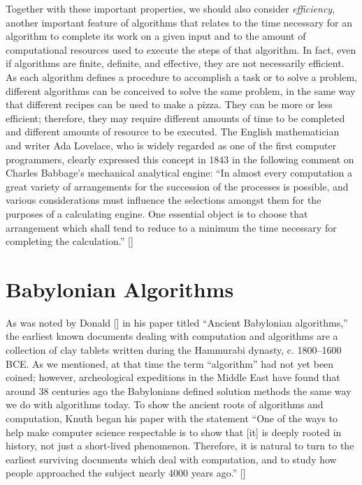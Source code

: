 \noindent Together with these important properties, we should also consider \textit{efficiency}, another important feature of algorithms that relates to the time necessary for an algorithm to complete its work on a given input and to the amount of computational resources used to execute the steps of that algorithm. In fact, even if algorithms are finite, definite, and effective, they are not necessarily efficient. As each algorithm defines a procedure to accomplish a task or to solve a problem, different algorithms can be conceived to solve the same problem, in the same way that different recipes can be used to make a pizza. They can be more or less efficient; therefore, they may require different amounts of time to be completed and different amounts of resource to be executed. The English mathematician and writer Ada Lovelace, who is widely regarded as one of the first computer programmers, clearly expressed this concept in 1843 in the following comment on Charles Babbage's mechanical analytical engine: ``In almost every computation a great variety of arrangements for the succession of the processes is possible, and various considerations must influence the selections amongst them for the purposes of a calculating engine. One essential object is to choose that arrangement which shall tend to reduce to a minimum the time necessary for completing the calculation.'' [\citealt{chap:01:Menabrea:1843}]

\section{\label{sec:1.2}Babylonian Algorithms}


As was noted by Donald \citeauthor{chap:01:Knuth:1972} [\citeyear{chap:01:Knuth:1972}] in his paper titled ``Ancient Babylonian algorithms,'' the earliest known documents dealing with computation and algorithms are a collection of clay tablets written during the Hammurabi dynasty, c. 1800--1600 BCE. As we mentioned, at that time the term ``algorithm'' had not yet been coined; however, archeological expeditions in the Middle East have found that around 38 centuries ago the Babylonians defined solution methods the same way we do with algorithms today. To show the ancient roots of algorithms and computation, Knuth began his paper with the statement ``One of the ways to help make computer science respectable is to show that [it] is deeply rooted in history, not just a short-lived phenomenon. Therefore, it is natural to turn to the earliest surviving documents which deal with computation, and to study how people approached the subject nearly 4000 years ago.'' [\citealt{chap:01:Knuth:1972}]


